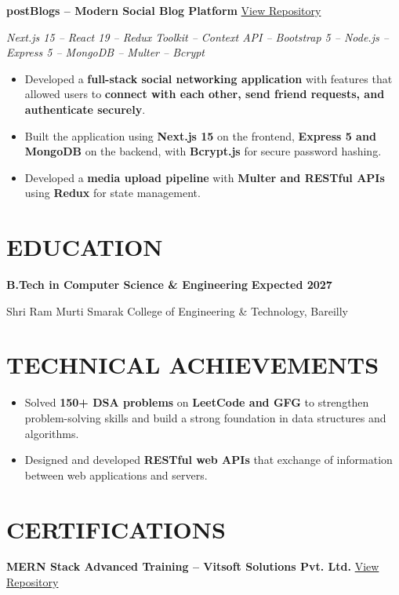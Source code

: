 \documentclass[10pt,a4paper]{article}
\begin{document}
\vspace{3pt}

\textbf{postBlogs -- Modern Social Blog Platform}
\hfill
\href{https://github.com/Amjadkhan9756/postBlogs}
{View Repository}

\textit{Next.js 15 -- React 19 -- Redux Toolkit -- Context API -- Bootstrap 5 -- Node.js -- Express 5 -- MongoDB -- Multer -- Bcrypt}

\begin{itemize}

    \item Developed a \textbf{full-stack social networking application} with features that allowed users to \textbf{connect with each other, send friend requests, and authenticate securely}.

    \item Built the application using \textbf{Next.js 15} on the frontend, \textbf{Express 5 and MongoDB} on the backend, with \textbf{Bcrypt.js} for secure password hashing.

    \item Developed a \textbf{media upload pipeline} with \textbf{Multer and RESTful APIs} using \textbf{Redux} for state management.

\end{itemize}

\section*{EDUCATION}

\textbf{B.Tech in Computer Science \& Engineering}
\hfill
\textbf{Expected 2027}

Shri Ram Murti Smarak College of Engineering \& Technology, Bareilly

\section*{TECHNICAL ACHIEVEMENTS}

\begin{itemize}

    \item Solved \textbf{150+ DSA problems} on \textbf{LeetCode and GFG} to strengthen problem-solving skills and build a strong foundation in data structures and algorithms.

    \item Designed and developed \textbf{RESTful web APIs} that  exchange of information between web applications and servers.

\end{itemize}

\section*{CERTIFICATIONS}

\textbf{MERN Stack Advanced Training -- Vitsoft Solutions Pvt. Ltd.}
\hfill
\href{https://github.com/Amjadkhan9756/certification/blob/main/Amjad_Intern\%20(1).pdf}
{View Repository}
\end{document}
